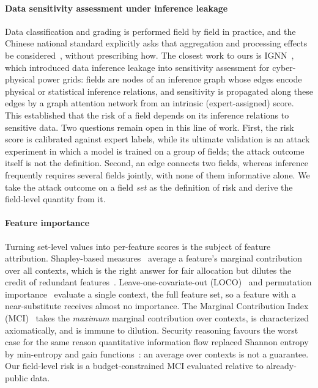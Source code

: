 \paragraph{Data sensitivity assessment under inference leakage}
Data classification and grading is performed field by field in practice, and the Chinese
national standard explicitly asks that aggregation and processing effects be
considered~\cite{gbt43697}, without prescribing how. The closest work to ours is IGNN~\cite{hu2026ignn},
which introduced data inference leakage into sensitivity assessment for cyber-physical power
grids: fields are nodes of an inference graph whose edges encode physical or statistical
inference relations, and sensitivity is propagated along these edges by a graph attention
network from an intrinsic (expert-assigned) score. This established that the risk of a field
depends on its inference relations to sensitive data. Two questions remain open in this line
of work. First, the risk score is calibrated against expert labels, while its ultimate
validation is an attack experiment in which a model is trained on a group of fields; the
attack outcome itself is not the definition. Second, an edge connects two fields, whereas
inference frequently requires several fields jointly, with none of them informative alone.
We take the attack outcome on a field \emph{set} as the definition of risk and derive the
field-level quantity from it.

\paragraph{Feature importance}
Turning set-level values into per-feature scores is the subject of feature attribution.
Shapley-based measures~\cite{shapley1953value,lundberg2017shap,covert2020sage,williamson2020spvim}
average a feature's marginal contribution over all contexts, which is the right answer for
fair allocation but dilutes the credit of redundant features~\cite{kumar2020shapley,catav2021mci}.
Leave-one-covariate-out (LOCO)~\cite{lei2018loco} and permutation importance~\cite{breiman2001rf,fisher2019mcr,hooker2021unrestricted}
evaluate a single context, the full feature set, so a feature with a near-substitute receives
almost no importance. The Marginal Contribution Index (MCI)~\cite{catav2021mci} takes the
\emph{maximum} marginal contribution over contexts, is characterized axiomatically, and is
immune to dilution. Security reasoning favours the worst case for the same reason
quantitative information flow replaced Shannon entropy by min-entropy and gain
functions~\cite{smith2009qif,alvim2012gleakage}: an average over contexts is not a guarantee.
Our field-level risk is a budget-constrained MCI evaluated relative to already-public data.

